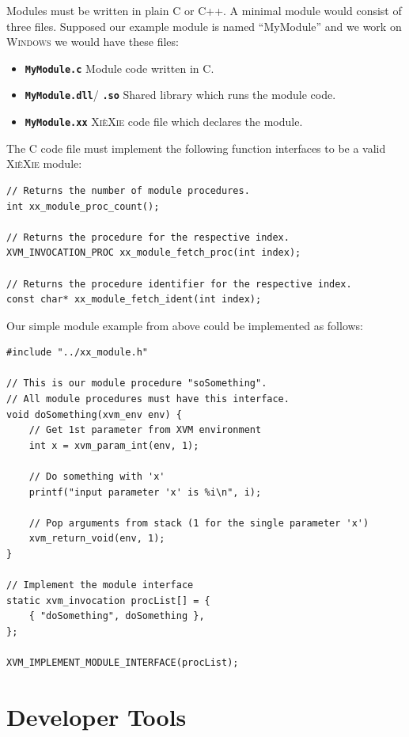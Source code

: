 \documentclass{report}
\def\xiexie{\textsc{Xi\`eXie}\xspace}
\def\cpp{\textsc{C++}\xspace}
\def\windows{\textsc{Windows}\xspace}
\begin{document}
Modules must be written in plain C or \cpp. A minimal module would consist of three files.
Supposed our example module is named ``MyModule'' and we work on \windows we would have these files:
\begin{itemize}
	\item \textbf{\texttt{MyModule.c}} Module code written in C.
	\item \textbf{\texttt{MyModule.dll}}/ \textbf{\texttt{.so}} Shared library which runs the module code.
	\item \textbf{\texttt{MyModule.xx}} \xiexie code file which declares the module. 
\end{itemize}
The C code file must implement the following function interfaces to be a valid \xiexie module:
\begin{lstlisting}
// Returns the number of module procedures.
int xx_module_proc_count();

// Returns the procedure for the respective index.
XVM_INVOCATION_PROC xx_module_fetch_proc(int index);

// Returns the procedure identifier for the respective index.
const char* xx_module_fetch_ident(int index);
\end{lstlisting}
Our simple module example from above could be implemented as follows:
\begin{lstlisting}
#include "../xx_module.h"

// This is our module procedure "soSomething".
// All module procedures must have this interface.
void doSomething(xvm_env env) {
    // Get 1st parameter from XVM environment
    int x = xvm_param_int(env, 1);
    
    // Do something with 'x'
    printf("input parameter 'x' is %i\n", i);
    
    // Pop arguments from stack (1 for the single parameter 'x')
    xvm_return_void(env, 1);
}

// Implement the module interface
static xvm_invocation procList[] = {
    { "doSomething", doSomething },
};

XVM_IMPLEMENT_MODULE_INTERFACE(procList);
\end{lstlisting}



\part{Developer Tools}
\end{document}
